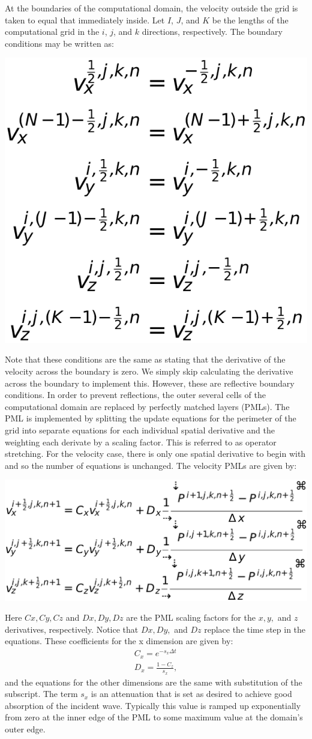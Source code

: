 At the boundaries of the computational domain, the velocity outside the grid is
taken to equal that immediately inside. Let $I$, $J$, and $K$ be the lengths of
the computational grid in the $i$, $j$, and $k$ directions, respectively. The
boundary conditions may be written as: 

\centerline{\includegraphics[width=0.3\linewidth]{steve/figs/image9.png}}

Note that these conditions are the same as stating that the derivative of the
velocity across the boundary is zero. We simply skip calculating the derivative
across the boundary to implement this. However, these are reflective boundary
conditions. In order to prevent reflections, the outer several cells of the
computational domain are replaced by perfectly matched layers (PMLs). The PML
is implemented by splitting the update equations for the perimeter of the grid
into separate equations for each individual spatial derivative and the
weighting each derivate by a scaling factor. This is referred to as operator
stretching. For the velocity case, there is only one spatial derivative to
begin with and so the 
number of equations is unchanged. The velocity PMLs are given by:

\centerline{\includegraphics[width=0.5\linewidth]{steve/figs/image10.png}}

Here $Cx, Cy, Cz$ and $Dx, Dy, Dz$ are the PML scaling factors for the $x, y,$
and $z$ derivatives, respectively. Notice that $Dx, Dy,$ and $Dz$ replace the
time step in the equations. These coefficients for the x dimension are given
by:
\begin{align*}
    C_x = e^{-s_x \Delta t}\\
    D_x = \frac{1-C_z}{s_x},
\end{align*}
and the equations for the other dimensions are the same with substitution of
the subscript. The term $s_x$ is an attenuation that is set as desired to
achieve good absorption of the incident wave. Typically this value is ramped up
exponentially from zero at the inner edge of the PML to some maximum value at
the domain’s outer edge.

